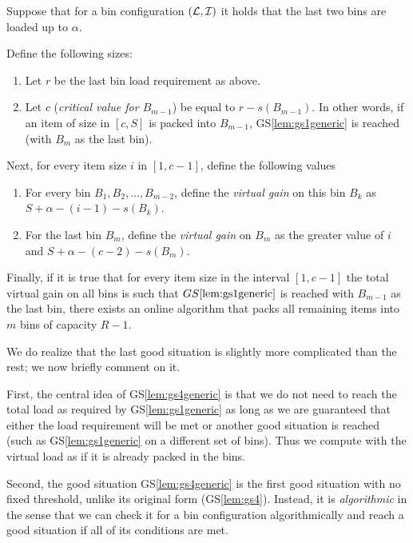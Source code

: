 \begin{goodsit}\label{lem:gs4generic}

Suppose that for a bin configuration $({\mathcal L}, {\mathcal I})$ it holds that
the last two bins are loaded up to $\alpha$. 

Define the following sizes:

\begin{enumerate}
\item Let $r$ be the last bin load requirement as above.
\item Let $c$ (\emph{critical value for $B_{m-1}$}) be equal to $r - s(B_{m-1})$.
In other words, if an item of size in $[c,S]$ is packed into $B_{m-1}$, GS\ref{lem:gs1generic}
is reached (with $B_{m}$ as the last bin).
\end{enumerate}

Next, for every item size $i$ in $[1,c-1]$, define the following values

\begin{enumerate}

\item For every bin $B_1, B_2, \ldots, B_{m-2}$, define the
\emph{virtual gain} on this bin $B_k$ as $S+\alpha - (i-1) - s(B_k)$.

\item For the last bin $B_m$, define the \emph{virtual gain} on $B_m$
as the greater value of $i$ and $S+\alpha - (c-2) - s(B_m)$.
\end{enumerate}

Finally, if it is true that for every item size in the interval
$[1,c-1]$ the total virtual gain on all bins is such that
$GS\ref{lem:gs1generic}$ is reached with $B_{m-1}$ as the last bin,
there exists an online algorithm that packs all remaining items into
$m$ bins of capacity $R-1$.
\end{goodsit}

We do realize that the last good situation is slightly more
complicated than the rest; we now briefly comment on it.

First, the central idea of GS\ref{lem:gs4generic} is that we do not
need to reach the total load as required by GS\ref{lem:gs1generic} as
long as we are guaranteed that either the load requirement will be met
or another good situation is reached (such as GS\ref{lem:gs1generic}
on a different set of bins). Thus we compute with the virtual load as
if it is already packed in the bins.

Second, the good situation GS\ref{lem:gs4generic} is the first good
situation with no fixed threshold, unlike its original form
(GS\ref{lem:gs4}). Instead, it is \emph{algorithmic} in the sense that
we can check it for a bin configuration algorithmically and reach a
good situation if all of its conditions are met.

